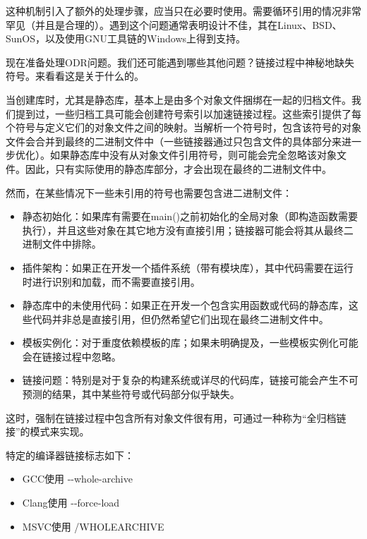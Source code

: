 
这种机制引入了额外的处理步骤，应当只在必要时使用。需要循环引用的情况非常罕见（并且是合理的）。遇到这个问题通常表明设计不佳，其在Linux、BSD、SunOS，以及使用GNU工具链的Windows上得到支持。

现在准备处理ODR问题。我们还可能遇到哪些其他问题？链接过程中神秘地缺失符号。来看看这是关于什么的。


当创建库时，尤其是静态库，基本上是由多个对象文件捆绑在一起的归档文件。我们提到过，一些归档工具可能会创建符号索引以加速链接过程。这些索引提供了每个符号与定义它们的对象文件之间的映射。当解析一个符号时，包含该符号的对象文件会合并到最终的二进制文件中（一些链接器通过只包含文件的具体部分来进一步优化）。如果静态库中没有从对象文件引用符号，则可能会完全忽略该对象文件。因此，只有实际使用的静态库部分，才会出现在最终的二进制文件中。

然而，在某些情况下一些未引用的符号也需要包含进二进制文件：

\begin{itemize}
\item
静态初始化：如果库有需要在main()之前初始化的全局对象（即构造函数需要执行），并且这些对象在其它地方没有直接引用；链接器可能会将其从最终二进制文件中排除。

\item
插件架构：如果正在开发一个插件系统（带有模块库），其中代码需要在运行时进行识别和加载，而不需要直接引用。

\item
静态库中的未使用代码：如果正在开发一个包含实用函数或代码的静态库，这些代码并非总是直接引用，但仍然希望它们出现在最终二进制文件中。

\item
模板实例化：对于重度依赖模板的库；如果未明确提及，一些模板实例化可能会在链接过程中忽略。

\item
链接问题：特别是对于复杂的构建系统或详尽的代码库，链接可能会产生不可预测的结果，其中某些符号或代码部分似乎缺失。
\end{itemize}

这时，强制在链接过程中包含所有对象文件很有用，可通过一种称为“全归档链接”的模式来实现。

特定的编译器链接标志如下：

\begin{itemize}
\item
GCC使用 -{}-whole-archive

\item
Clang使用 -{}-force-load

\item
MSVC使用 /WHOLEARCHIVE
\end{itemize}

